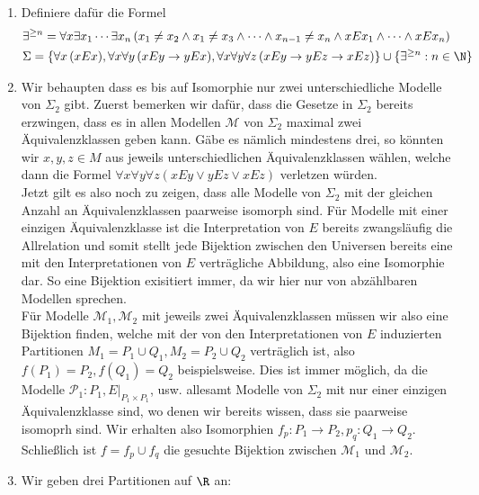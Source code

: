 \begin{solution}

\phantom{}
\begin{enumerate}[label = \alph*.]
\item Definiere dafür die Formel
\begin{align*}
  &\exists^{\geq n} = \forall x \exists x_1 \cdots \exists x_n\, (x_1 \neq x_2 \land x_1 \neq x_3
  \land \cdots \land x_{n-1} \neq x_n \land xEx_1 \land \cdots \land xEx_n) \\
  &\Sigma = \{\forall x\, (xEx), \forall x \forall y\, (xEy \rightarrow yEx),
  \forall x \forall y \forall z\, (xEy \rightarrow yEz \rightarrow xEz)\} \cup
  \{\exists^{\geq n}: n \in \N\}
\end{align*}
\item Wir behaupten dass es bis auf Isomorphie nur zwei unterschiedliche Modelle von $\Sigma_2$ gibt.
Zuerst bemerken wir dafür, dass die Gesetze in $\Sigma_2$ bereits erzwingen, dass es in allen Modellen $\mathscr{M}$ von $\Sigma_2$ maximal zwei Äquivalenzklassen
geben kann. Gäbe es nämlich mindestens drei, so könnten wir $x,y,z \in M$ aus jeweils unterschiedlichen
Äquivalenzklassen wählen, welche dann die Formel $\forall x \forall y \forall z (xEy \lor yEz \lor xEz)$
verletzen würden. \\
Jetzt gilt es also noch zu zeigen, dass alle Modelle von $\Sigma_2$ mit der gleichen
Anzahl an Äquivalenzklassen paarweise isomorph sind. Für Modelle mit einer einzigen
Äquivalenzklasse ist die Interpretation von $E$ bereits zwangsläufig die Allrelation
und somit stellt jede Bijektion zwischen den Universen bereits eine mit den Interpretationen
von $E$ verträgliche Abbildung, also eine Isomorphie dar. So eine Bijektion exisitiert
immer, da wir hier nur von abzählbaren Modellen sprechen. \\
Für Modelle $\mathscr{M}_1,\mathscr{M}_2$ mit jeweils zwei Äquivalenzklassen müssen
wir also eine Bijektion finden, welche mit der von den Interpretationen von $E$
induzierten Partitionen $M_1 = P_1 \cup Q_1, M_2 = P_2 \cup Q_2$ verträglich ist,
also $f(P_1) = P_2, f(Q_1) = Q_2$ beispielsweise. Dies ist immer möglich, da die Modelle
$\mathscr{P_1}: P_1, E|_{P_1 \times P_1}$, usw. allesamt Modelle von $\Sigma_2$
mit nur einer einzigen Äquivalenzklasse sind, wo denen wir bereits wissen,
dass sie paarweise isomoprh sind. Wir erhalten also Isomorphien $f_p: P_1 \to P_2, p_q: Q_1 \to Q_2$.
Schließlich ist $f = f_p \cup f_q$ die gesuchte Bijektion zwischen $\mathscr{M}_1$
und $\mathscr{M}_2$.
\item Wir geben drei Partitionen auf $\R$ an:

\end{enumerate}
\end{solution}
